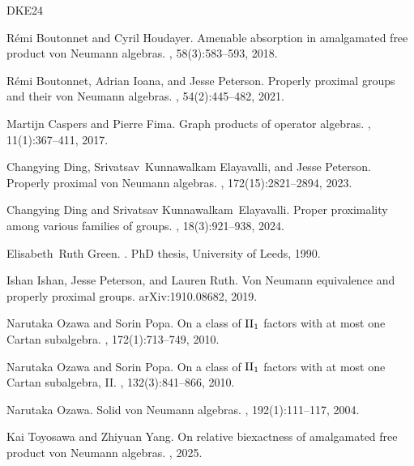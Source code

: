 \documentclass[a4paper, 11pt, reqno]{amsart}
\numberwithin{equation}{section}
\theoremstyle{plain}
\theoremstyle{remark}
\theoremstyle{definition}
\begin{document}
\begin{thebibliography}{DKE24}

R\'emi Boutonnet and Cyril Houdayer.
\newblock Amenable absorption in amalgamated free product von {N}eumann algebras.
, 58(3):583--593, 2018.

R\'emi Boutonnet, Adrian Ioana, and Jesse Peterson.
\newblock Properly proximal groups and their von {N}eumann algebras.
, 54(2):445--482, 2021.

Martijn Caspers and Pierre Fima.
\newblock Graph products of operator algebras.
, 11(1):367--411, 2017.

Changying Ding, Srivatsav~Kunnawalkam Elayavalli, and Jesse Peterson.
\newblock Properly proximal von {N}eumann algebras.
, 172(15):2821--2894, 2023.

Changying Ding and Srivatsav Kunnawalkam~Elayavalli.
\newblock Proper proximality among various families of groups.
, 18(3):921--938, 2024.

Elisabeth~Ruth Green.
.
\newblock PhD thesis, University of Leeds, 1990.

Ishan Ishan, Jesse Peterson, and Lauren Ruth.
\newblock Von {N}eumann equivalence and properly proximal groups.
\newblock arXiv:1910.08682, 2019.

Narutaka Ozawa and Sorin Popa.
\newblock On a class of {${\rm II}_1$} factors with at most one {C}artan subalgebra.
, 172(1):713--749, 2010.

Narutaka Ozawa and Sorin Popa.
\newblock On a class of {${\rm II}_1$} factors with at most one {C}artan subalgebra, {II}.
, 132(3):841--866, 2010.

Narutaka Ozawa.
\newblock Solid von {N}eumann algebras.
, 192(1):111--117, 2004.

Kai Toyosawa and Zhiyuan Yang.
\newblock On relative biexactness of amalgamated free product von {N}eumann algebras.
, 2025.

\end{thebibliography}
\end{document}
